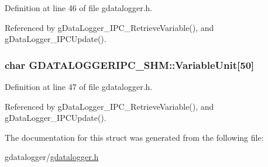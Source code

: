 Definition at line 46 of file gdatalogger.h.



Referenced by gDataLogger\_\-IPC\_\-RetrieveVariable(), and gDataLogger\_\-IPCUpdate().

\hypertarget{structGDATALOGGERIPC__SHM_a8efd7b2ed8ff087f9694cb47a8c25a13}{
\subsubsection[{VariableUnit}]{\setlength{\rightskip}{0pt plus 5cm}char {\bf GDATALOGGERIPC\_\-SHM::VariableUnit}\mbox{[}50\mbox{]}}}
\label{structGDATALOGGERIPC__SHM_a8efd7b2ed8ff087f9694cb47a8c25a13}


Definition at line 47 of file gdatalogger.h.



Referenced by gDataLogger\_\-IPC\_\-RetrieveVariable(), and gDataLogger\_\-IPCUpdate().



The documentation for this struct was generated from the following file:\begin{DoxyCompactItemize}
\item 
gdatalogger/\hyperlink{gdatalogger_8h}{gdatalogger.h}\end{DoxyCompactItemize}
